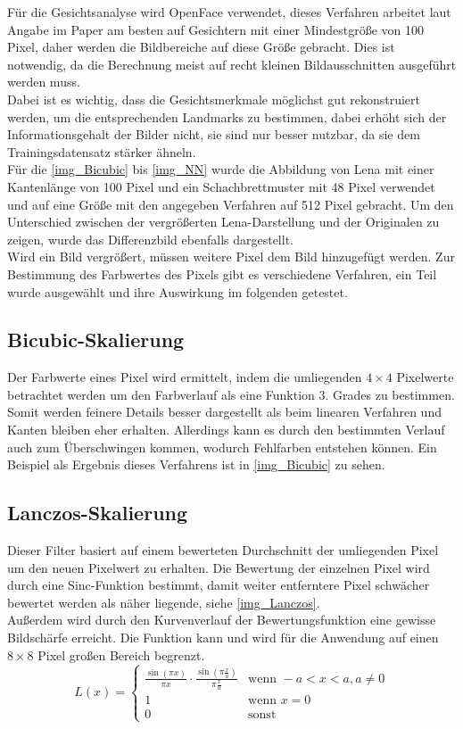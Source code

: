 Für die Gesichtsanalyse wird OpenFace verwendet, dieses Verfahren arbeitet laut Angabe im Paper \cite{OpenFace} am besten auf Gesichtern mit einer Mindestgröße von 100 Pixel, daher werden die Bildbereiche auf diese Größe gebracht. Dies ist notwendig, da die Berechnung meist auf recht kleinen Bildausschnitten ausgeführt werden muss.\\
Dabei ist es wichtig, dass die Gesichtsmerkmale möglichst gut rekonstruiert werden, um die entsprechenden Landmarks zu bestimmen, dabei erhöht sich der Informationsgehalt der Bilder nicht, sie sind nur besser nutzbar, da sie dem Trainingsdatensatz stärker ähneln.\\
Für die \autoref{img_Bicubic} bis \ref{img_NN} wurde die Abbildung von Lena mit einer Kantenlänge von 100 Pixel und ein Schachbrettmuster mit 48 Pixel verwendet und auf eine Größe mit den angegeben Verfahren auf 512 Pixel gebracht. Um den Unterschied zwischen der vergrößerten Lena-Darstellung und der Originalen zu zeigen, wurde das Differenzbild ebenfalls dargestellt.\\
Wird ein Bild vergrößert, müssen weitere Pixel dem Bild hinzugefügt werden. Zur Bestimmung des Farbwertes des Pixels gibt es verschiedene Verfahren, ein Teil wurde ausgewählt und ihre Auswirkung im folgenden getestet.
\subsection{Bicubic-Skalierung}
Der Farbwerte eines Pixel wird ermittelt, indem die umliegenden $4\times 4$ Pixelwerte betrachtet werden um den Farbverlauf als eine Funktion 3. Grades zu bestimmen. Somit werden feinere Details besser dargestellt als beim linearen Verfahren und Kanten bleiben eher erhalten. Allerdings kann es durch den bestimmten Verlauf auch zum Überschwingen kommen, wodurch Fehlfarben entstehen können. Ein Beispiel als Ergebnis dieses Verfahrens ist in \autoref{img_Bicubic} zu sehen. \cite{wiki_Bicubic}
\subsection{Lanczos-Skalierung}
Dieser Filter basiert auf einem bewerteten Durchschnitt der umliegenden Pixel um den neuen Pixelwert zu erhalten. Die Bewertung der einzelnen Pixel wird durch eine Sinc-Funktion bestimmt, damit weiter entferntere Pixel schwächer bewertet werden als näher liegende, siehe \autoref{img_Lanczos}.\\
Außerdem wird durch den Kurvenverlauf der Bewertungsfunktion eine gewisse Bildschärfe erreicht. Die Funktion kann und wird für die Anwendung auf einen $8\times 8$ Pixel großen Bereich begrenzt. \cite{wiki_Lanczos}
\[ L(x)= \left\{ \begin{array}{ll}
\frac{\sin(\pi x)}{\pi x} \cdot \frac{\sin(\pi \frac{x}{a})}{\pi \frac{x}{a}} & \textrm{wenn } -a < x <a, a\ne 0\\
1 & \textrm{wenn } x = 0\\
0 & \textrm{sonst}
\end{array}\right. \]
